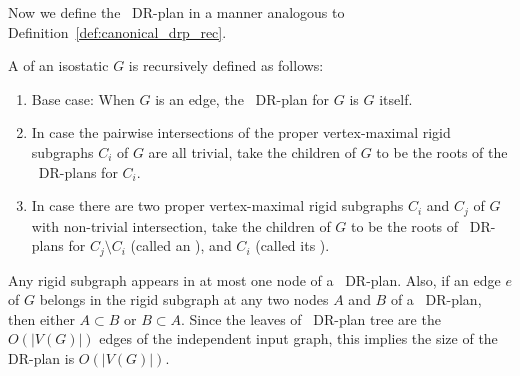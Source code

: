 



Now we define the \pseudosequential\ DR-plan in a manner analogous to Definition~\ref{def:canonical_drp_rec}.

\begin{definition}
\label{def:pseudoseqdrp}
    A  of an isostatic $G$ is recursively defined as follows:
    \begin{enumerate}
        \item Base case: When $G$ is an edge, the \pseudosequential\ DR-plan for $G$ is $G$ itself.
        \item In case the pairwise intersections of the proper vertex-maximal rigid subgraphs $C_i$ of $G$  are all trivial, take the children of $G$ to be the roots of the \pseudosequential\ DR-plans for $C_i$.
        \item In case there are two proper vertex-maximal rigid subgraphs $C_i$ and $C_j$ of $G$ with non-trivial intersection, take the children of $G$ to be the roots of \pseudosequential\ DR-plans for $C_j\setminus C_i$ (called an ), and $C_i$ (called its ).
    \end{enumerate}
\end{definition}

\begin{remark}
    Any rigid subgraph appears in at most one node of a \pseudosequential\ DR-plan. Also, if an edge $e$ of $G$ belongs in the rigid subgraph at any two nodes $A$ and $B$ of a \pseudosequential\ DR-plan, then either $A\subset B$ or $B\subset A$. Since the leaves of \pseudosequential\ DR-plan tree are the $O(|V(G)|)$ edges of the independent input graph, this implies the size of the DR-plan is $O(|V(G)|)$.
\end{remark}

